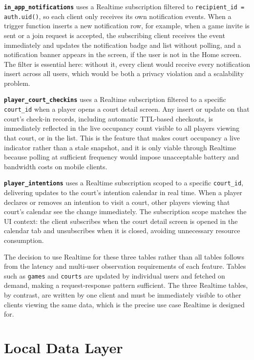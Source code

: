 \textbf{\texttt{in\_app\_notifications}} uses a Realtime subscription filtered to \texttt{recipient\_id = auth.uid()}, so each client only receives its own notification events. 
When a trigger function inserts a new notification row, for example, when a game invite is sent or a join request is accepted, the subscribing client receives the event immediately and updates the notification badge and list without polling, and a notification banner appears in the screen, if the user is not in the Home screen.
The filter is essential here: without it, every client would receive every notification insert across all users, which would be both a privacy violation and a scalability problem.

\textbf{\texttt{player\_court\_checkins}} uses a Realtime subscription filtered to a specific \texttt{court\_id} when a player opens a court detail screen. 
Any insert or update on that court's check-in records, including automatic TTL-based checkouts, is immediately reflected in the live occupancy count visible to all players viewing that court, or in the list. 
This is the feature that makes court occupancy a live indicator rather than a stale snapshot, and it is only viable through Realtime because polling at sufficient frequency would impose unacceptable battery and bandwidth costs on mobile clients.

\textbf{\texttt{player\_intentions}} uses a Realtime subscription scoped to a specific \texttt{court\_id}, delivering updates to the court's intention calendar in real time.
When a player declares or removes an intention to visit a court, other players viewing that court's calendar see the change immediately. 
The subscription scope matches the UI context: the client subscribes when the court detail screen is opened in the calendar tab and unsubscribes when it is closed, avoiding unnecessary resource consumption.

The decision to use Realtime for these three tables rather than all tables follows from the latency and multi-user observation requirements of each feature. 
Tables such as \texttt{games} and \texttt{courts} are updated by individual users and fetched on demand, making a request-response pattern sufficient. 
The three Realtime tables, by contrast, are written by one client and must be immediately visible to other clients viewing the same data, which is the precise use case Realtime is designed for.



\section{Local Data Layer}
\label{sec:arch-local-data}

